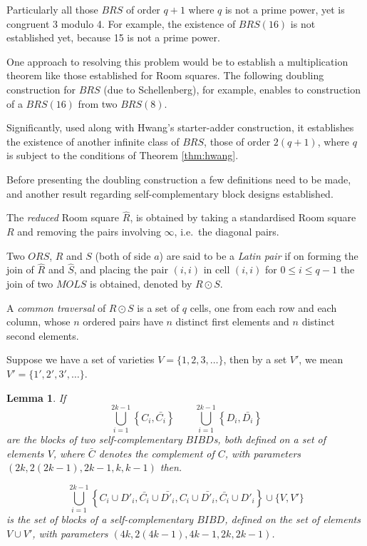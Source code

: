 \documentclass[
  11pt,
  a4paper]{book}
\newtheorem{lemma}[theorem]{Lemma}
\newcounter{example}
\begin{document}
Particularly all those \(BRS\) of order \(q + 1\) where \(q\) is not a
prime power, yet is congruent 3 modulo 4. For example, the existence of
\(BRS(16)\) is not established yet, because 15 is not a prime power.

One approach to resolving this problem would be to establish a
multiplication theorem like those established for Room squares. The
following doubling construction for \(BRS\) (due to Schellenberg), for
example, enables to construction of a \(BRS(16)\) from two \(BRS(8)\).

Significantly, used along with Hwang's starter-adder construction, it
establishes the existence of another infinite class of \(BRS\), those of
order \(2(q + 1)\), where \(q\) is subject to the conditions of Theorem
\ref{thm:hwang}.

Before presenting the doubling construction a few definitions need to be
made, and another result regarding self-complementary block designs
established.

The \emph{reduced} Room square \(\hat{R}\), is obtained by taking a
standardised Room square \(R\) and removing the pairs involving
\(\infty\), i.e.~the diagonal pairs.

Two \(ORS\), \(R\) and \(S\) (both of side \(a\)) are said to be a
\emph{Latin pair} if on forming the join of \(\hat{R}\) and \(\hat{S}\),
and placing the pair \((i, i)\) in cell \((i, i)\) for
\(0 \leq i \leq q - 1\) the join of two \(MOLS\) is obtained, denoted by
\(R \odot S\).

A \emph{common traversal} of \(R \odot S\) is a set of \(q\) cells, one
from each row and each column, whose \(n\) ordered pairs have \(n\)
distinct first elements and \(n\) distinct second elements.

Suppose we have a set of varieties \(V = \{1, 2, 3, \ldots\}\), then by
a set \(V'\), we mean \(V'=\{1', 2', 3', \ldots\}\).

\begin{lemma}
If
\begin{equation}
  \bigcup\limits_{i=1}^{2k-1} \left \{C_i,\bar{C_i} \right \} 
  \qquad \bigcup\limits_{i=1}^{2k-1} \left \{D_i,\bar{D_i} \right \}
\end{equation}
are the blocks of two self-complementary $BIBD$s, both
defined on a set of elements $V$, where $\bar{C}$ denotes
the complement of $C$, with parameters
$(2k, 2(2k - 1), 2k - 1, k, k-1)$ then.

\begin{equation}
\bigcup\limits_{i=1}^{2k-1} \left \{C_i \cup D'_i, \bar{C_i} \cup \bar{D'_i}, C_i \cup \bar{D'_i}, \bar{C_i} \cup D'_i  \right \} \cup \{V,V'\}
\end{equation}
is the set of blocks of a self-complementary $BIBD$, defined
on the set of elements $V \cup V'$, with parameters
$(4k, 2(4k - 1), 4k - 1, 2k, 2k - 1)$.
\end{lemma}
\end{document}
